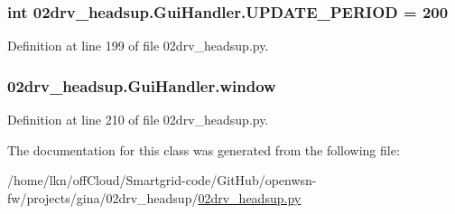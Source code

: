 \subsubsection[{\texorpdfstring{U\+P\+D\+A\+T\+E\+\_\+\+P\+E\+R\+I\+OD}{UPDATE_PERIOD}}]{\setlength{\rightskip}{0pt plus 5cm}int 02drv\+\_\+headsup.\+Gui\+Handler.\+U\+P\+D\+A\+T\+E\+\_\+\+P\+E\+R\+I\+OD = 200\hspace{0.3cm}{\ttfamily [static]}}\hypertarget{class02drv__headsup_1_1_gui_handler_a9a50d6feeefb7272aa2263024f792b6e}{}\label{class02drv__headsup_1_1_gui_handler_a9a50d6feeefb7272aa2263024f792b6e}


Definition at line 199 of file 02drv\+\_\+headsup.\+py.

\subsubsection[{\texorpdfstring{window}{window}}]{\setlength{\rightskip}{0pt plus 5cm}02drv\+\_\+headsup.\+Gui\+Handler.\+window}\hypertarget{class02drv__headsup_1_1_gui_handler_a4caff282bebd00ef7bdf63f691caa517}{}\label{class02drv__headsup_1_1_gui_handler_a4caff282bebd00ef7bdf63f691caa517}


Definition at line 210 of file 02drv\+\_\+headsup.\+py.



The documentation for this class was generated from the following file\+:\begin{DoxyCompactItemize}
\item 
/home/lkn/off\+Cloud/\+Smartgrid-\/code/\+Git\+Hub/openwsn-\/fw/projects/gina/02drv\+\_\+headsup/\hyperlink{02drv__headsup_8py}{02drv\+\_\+headsup.\+py}\end{DoxyCompactItemize}
